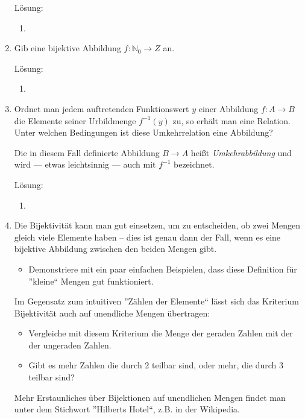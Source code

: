 \documentclass[../main.tex]{subfiles}
\begin{document}
\begin{enumerate}
	      Lösung:
	      \begin{enumerate}
		      \item
	      \end{enumerate}
	\item Gib eine bijektive Abbildung \( f: \mathbb{N}_0 \rightarrow Z \) an.

	      Lösung:
	      \begin{enumerate}
		      \item
	      \end{enumerate}
	\item Ordnet man jedem auftretenden Funktionswert \( y \) einer Abbildung  \( f: A \rightarrow B \)
	      die Elemente seiner Urbildmenge \( f^{-1}(y) \) zu, so erhält man eine Relation.
	      Unter welchen Bedingungen ist diese Umkehrrelation eine Abbildung?

	      Die in diesem Fall definierte Abbildung \( B \rightarrow A \) heißt \textit{Umkehrabbildung} und
	      wird — etwas leichtsinnig — auch mit \( f^{-1} \) bezeichnet.

	      Lösung:
	      \begin{enumerate}
		      \item
	      \end{enumerate}
	\item Die Bijektivität kann man gut einsetzen, um zu entscheiden, ob zwei Mengen
	      gleich viele Elemente haben – dies ist genau dann der Fall, wenn es eine
	      bijektive Abbildung zwischen den beiden Mengen gibt.
	      \begin{itemize}
		      \item Demonstriere mit ein paar einfachen Beispielen, dass diese Definition
		            für ”kleine“ Mengen gut funktioniert.
	      \end{itemize}
	      Im Gegensatz zum intuitiven ”Zählen der Elemente“ lässt sich das Kriterium
	      Bijektivität auch auf unendliche Mengen übertragen:
	      \begin{itemize}
		      \item Vergleiche mit diesem Kriterium die Menge der geraden Zahlen mit der
		            der ungeraden Zahlen.
		      \item Gibt es mehr Zahlen die durch 2 teilbar sind, oder mehr, die durch 3
		            teilbar sind?
	      \end{itemize}
	      Mehr Erstaunliches über Bijektionen auf unendlichen Mengen findet man unter dem Stichwort
	      ”Hilberts Hotel“, z.B. in der Wikipedia.


\end{enumerate}
\end{document}

